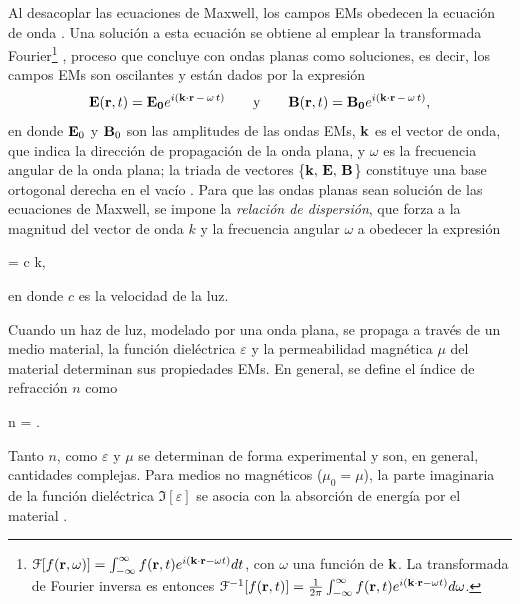 Al desacoplar las ecuaciones de Maxwell, los campos EMs obedecen la ecuación de onda \cite{hecht1998optics} . Una solución a esta ecuación se obtiene al emplear la transformada Fourier\footnote{  $\mathcal{F}[f(\vb{r},\omega)] = \int_{-\infty}^\infty f(\vb{r},t) e^{i(\vb{k}\cdot\vb{r} -\omega t)} dt$, con $\omega$ una función de $\vb{k}$. La transformada de Fourier inversa es entonces $\mathcal{F}^{-1}[f(\vb{r},t)] =\frac{1}{2\pi} \int_{-\infty}^\infty f(\vb{r},t) e^{i(\vb{k}\cdot\vb{r} -\omega t)} d\omega$.} \cite{jackson1999electrodynamics}, proceso que concluye con ondas planas como soluciones, es decir, los campos EMs son oscilantes y están dados por la expresión
	\begin{align}
	\vb{E}(\vb{r},t) =\vb{E_0}e^{i(\vb{k}\cdot\vb{r} \,-\,\omega \,t)}
		\qquad\mbox{y}\qquad
	\vb{B}(\vb{r}, t) =\vb{B_0}e^{i(\vb{k}\cdot\vb{r} \,-\,\omega\, t)},
	\label{eq:OndaPlana}
	\end{align}		
en donde  $\vb{E}_0$ y $\vb{B}_0$ son las amplitudes de las ondas EMs, $\vb{k}$ es el vector de onda, que indica la dirección de propagación de la onda plana, y $\omega$ es la frecuencia angular de la onda plana; la triada de vectores \{$\vb{k},\, \vb{E},\, \vb{B}$\} constituye una base ortogonal derecha en el vacío \cite{griffiths2013electrodynamics}. Para que las ondas planas sean solución de las ecuaciones de Maxwell, se impone la \emph{relación de dispersión}, que forza a  la magnitud del vector de onda $k$ y la frecuencia angular $\omega$ a obedecer la expresión \vspace*{-.5em}
	\begin{tcolorbox}[title = Relación de dispersión, ams align]
	\omega = c k,
	\label{eq:dispersion}
	\end{tcolorbox}\vspace*{-1em}\noindent
en donde  $c$ es la velocidad de la luz. 

Cuando un haz de luz, modelado por una onda plana, se propaga a través de un medio material, la función dieléctrica $\varepsilon$ y la permeabilidad magnética $\mu$ del material determinan sus propiedades EMs. En general, se define el índice de refracción $n$ como       \vspace*{-.5em}
	\begin{tcolorbox}[title = Índice de refracción, ams align]
	n = .
		\label{eq:indice} 
	\end{tcolorbox}\vspace*{-.5em}\noindent
Tanto $n$, como $\varepsilon$ y $\mu$ se determinan de forma experimental y son, en general, cantidades complejas. Para medios no magnéticos ($\mu_0 = \mu$), la parte imaginaria de la función dieléctrica $\Im[\varepsilon]$ se asocia con la absorción de energía por el material \cite{ibach2003solid}.

